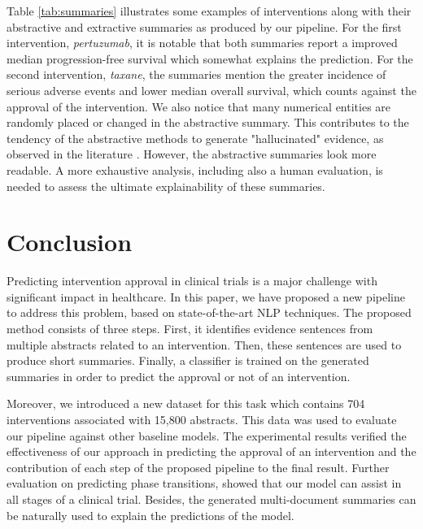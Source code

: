 \documentclass[11pt]{article}
\begin{document}
\begin{table*}[htb]
\begin{tabular}{p{0.12\linewidth}|c|p{}|p{}}
\end{tabular}
\caption{Examples of generated summaries from our models. These summaries can be used to explain the predictions of the classifier. The second column displays the prediction of the classifier for the specific intervention;   denotes approval and  denotes termination. }
\label{tab:summaries}
\end{table*}
\vfill

Table \ref{tab:summaries} illustrates some examples of interventions along with their abstractive and extractive summaries as produced by our pipeline. For the first intervention, \emph{pertuzumab}, it is notable that both summaries report a improved median progression-free survival which somewhat explains the prediction. For the second intervention, \emph{taxane}, the summaries mention the greater incidence of serious adverse events and lower median overall survival, which counts against the approval of the intervention. We also notice that many numerical entities are randomly placed or changed in the abstractive summary. This contributes to  the tendency of the abstractive methods to generate "hallucinated" evidence, as observed in the literature \cite{cao2018faithful}. However, the abstractive summaries look more readable. A more exhaustive analysis, including also a human evaluation, is needed to assess the ultimate explainability of these summaries. 

\section{Conclusion}
Predicting intervention approval in clinical trials is a major challenge with significant impact in healthcare. In this paper, we have proposed a new pipeline to address this problem, based on state-of-the-art NLP techniques. The proposed method consists of three steps. First, it identifies evidence sentences from multiple abstracts  related to an intervention. Then, these sentences are used to produce short summaries. Finally, a classifier is trained on the generated summaries in order to predict the approval or not of an intervention.

Moreover, we introduced a new dataset for this task which contains 704 interventions associated with 15,800 abstracts. This data was used to evaluate our pipeline against other baseline models. The experimental results verified the effectiveness of our approach in predicting the approval of an intervention and the contribution of each step of the proposed pipeline to the final result. Further evaluation on predicting phase transitions, showed that our model can assist in all stages of a clinical trial. Besides, the generated multi-document summaries can be naturally used to explain the predictions of the model.
\end{document}
